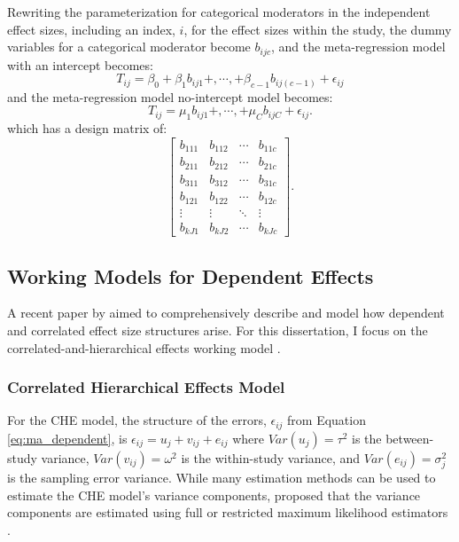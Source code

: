 Rewriting the parameterization for categorical moderators in the independent effect sizes, including an index, $i$, for the effect sizes within the study, the dummy variables for a categorical moderator become $b_{ijc}$, and the meta-regression model with an intercept becomes:
\begin{equation}
    T_{ij} = \beta_0 + \beta_1 b_{ij1} +, \cdots, +   \beta_{c-1}  b_{ij(c-1)} 
    +\epsilon_{ij}
\end{equation}
and the meta-regression model no-intercept model becomes:
\begin{equation} \label{eq: no-intercept dependent}
    T_{ij} = \mu_1 b_{ij1} +, \cdots, +   \mu_{C}  b_{ijC} 
    +\epsilon_{ij}.
\end{equation}
which has a design matrix of:
\begin{equation}
    \begin{bmatrix}
     b_{111} & b_{112} &\cdots  & b_{11c} \\
     b_{211} & b_{212} &\cdots  & b_{21c} \\
     b_{311} & b_{312} &\cdots  & b_{31c} \\
     b_{121} & b_{122} & \cdots & b_{12c}\\
     \vdots & \vdots & \ddots & \vdots\\
     b_{kJ1} & b_{kJ2} & \cdots & b_{kJc}
    \end{bmatrix}.
    \nonumber
\end{equation}



\subsection{Working Models for Dependent Effects}

A recent paper by \textcite{pustejovsky2022} aimed to comprehensively describe and model how dependent and correlated effect size structures arise. For this dissertation, I focus on the correlated-and-hierarchical effects working model  \autocite[CHE;][]{ pustejovsky2022}. 

\subsubsection{Correlated Hierarchical Effects Model} 
For the CHE model, the structure of the errors, $\epsilon_{ij}$ from Equation \ref{eq:ma_dependent}, is $\epsilon_{ij} = u_j + v_{ij}+ e_{ij} $ where $Var(u_j) = \tau^2$ is the between-study variance, $Var(v_{ij})= \omega^2$ is the within-study variance, and $Var(e_{ij}) = \sigma^2_j$ is the sampling error variance. While many estimation methods can be used to estimate the CHE model's variance components, \textcite{pustejovsky2022} proposed that the variance components are estimated using full or restricted maximum likelihood estimators \autocite[REML;][]{viechtbauer2005}. 

